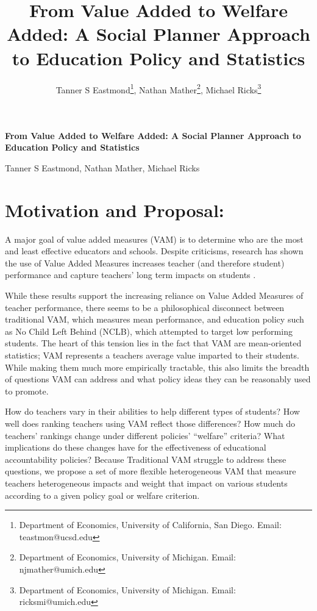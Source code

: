 \documentclass[letterpaper,12pt]{article}
\title{From Value Added to Welfare Added: A Social Planner Approach to Education Policy and Statistics}
\author{
Tanner S Eastmond\thanks{Department of Economics, University of California, San Diego. Email: teastmon@ucsd.edu}, Nathan Mather\thanks{Department of Economics, University of Michigan. Email: njmather@umich.edu }, Michael Ricks\thanks{Department of Economics, University of Michigan. Email: ricksmi@umich.edu}}
\date{\vspace{-8ex}}
\begin{document}
\begin{center}
\noindent \textbf{From Value Added to Welfare Added: A Social Planner Approach to Education Policy and Statistics}

Tanner S Eastmond, Nathan Mather, Michael Ricks
\end{center}



\section{Motivation and Proposal:}
A major goal of value added measures (VAM) is to determine who are the most and least effective educators and schools. Despite criticisms, research has shown the use of Value Added Measures increases  teacher (and therefore student) performance and capture teachers' long term impacts on students \citep{chetty2014measuring2, pope2019effect}. 

While these results support the increasing reliance on Value Added Measures of teacher performance, there seems to be a philosophical disconnect between traditional  VAM, which measures mean performance, and education policy such as No Child Left Behind (NCLB), which attempted to target low performing students. The heart of this tension lies in the fact that VAM are mean-oriented statistics; VAM represents a teachers average value imparted to their students. While making them much more empirically tractable, this also limits the breadth of questions VAM can address and what policy ideas they can be reasonably used to promote. 

How do teachers vary in their abilities to help different types of students? How well does ranking teachers using VAM reflect those differences? How much do teachers' rankings change under different policies' ``welfare'' criteria?  What implications do these changes have for the effectiveness of educational accountability policies? Because Traditional VAM  struggle to address these questions, we propose a set of more flexible heterogeneous VAM that measure teachers heterogeneous impacts and weight that impact on various students according to a given policy goal or welfare criterion. 
\end{document}
